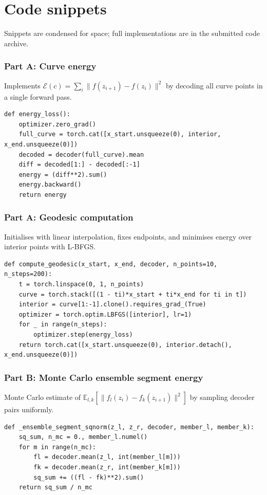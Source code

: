 \section*{Code snippets}

\noindent Snippets are condensed for space; full implementations are in the submitted code archive.

\subsubsection*{Part A: Curve energy}
Implements $\mathcal{E}(c) = \sum_i \|f(z_{i+1}) - f(z_i)\|^2$ by decoding all curve points in a single forward pass.
\begin{lstlisting}
def energy_loss():
    optimizer.zero_grad()
    full_curve = torch.cat([x_start.unsqueeze(0), interior, x_end.unsqueeze(0)])
    decoded = decoder(full_curve).mean
    diff = decoded[1:] - decoded[:-1]
    energy = (diff**2).sum()
    energy.backward()
    return energy
\end{lstlisting}

\subsubsection*{Part A: Geodesic computation}
Initialises with linear interpolation, fixes endpoints, and minimises energy over interior points with L-BFGS.
\begin{lstlisting}
def compute_geodesic(x_start, x_end, decoder, n_points=10, n_steps=200):
    t = torch.linspace(0, 1, n_points)
    curve = torch.stack([(1 - ti)*x_start + ti*x_end for ti in t])
    interior = curve[1:-1].clone().requires_grad_(True)
    optimizer = torch.optim.LBFGS([interior], lr=1)
    for _ in range(n_steps):
        optimizer.step(energy_loss)
    return torch.cat([x_start.unsqueeze(0), interior.detach(), x_end.unsqueeze(0)])
\end{lstlisting}

\subsubsection*{Part B: Monte Carlo ensemble segment energy}
Monte Carlo estimate of $\mathbb{E}_{l,k}[\|f_l(z_i) - f_k(z_{i+1})\|^2]$ by sampling decoder pairs uniformly.
\begin{lstlisting}
def _ensemble_segment_sqnorm(z_l, z_r, decoder, member_l, member_k):
    sq_sum, n_mc = 0., member_l.numel()
    for m in range(n_mc):
        fl = decoder.mean(z_l, int(member_l[m]))
        fk = decoder.mean(z_r, int(member_k[m]))
        sq_sum += ((fl - fk)**2).sum()
    return sq_sum / n_mc
\end{lstlisting}

